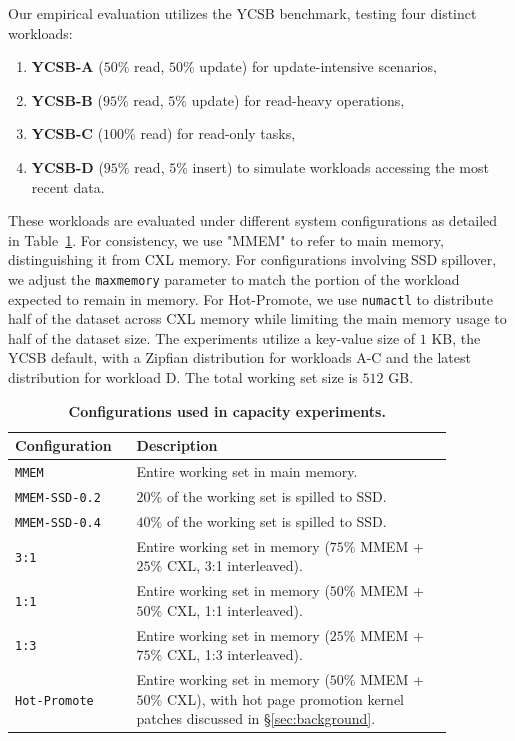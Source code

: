 Our empirical evaluation utilizes the YCSB benchmark, testing four distinct workloads:
\begin{enumerate}[leftmargin=*, itemsep=0pt]
    \item \textbf{YCSB-A} ($50\%$ read, $50\%$ update) for update-intensive scenarios,
    \item \textbf{YCSB-B} ($95\%$ read, $5\%$ update) for read-heavy operations,
    \item \textbf{YCSB-C} ($100\%$ read) for read-only tasks,
    \item \textbf{YCSB-D} ($95\%$ read, $5\%$ insert) to simulate workloads accessing the most recent data.
\end{enumerate}
These workloads are evaluated under different system configurations as detailed in Table~\ref{tab:swconfig}. For consistency, we use "MMEM" to refer to main memory, distinguishing it from CXL memory. For configurations involving SSD spillover, we adjust the \texttt{maxmemory} parameter to match the portion of the workload expected to remain in memory. For Hot-Promote, we use \texttt{numactl} to distribute half of the dataset across CXL memory while limiting the main memory usage to half of the dataset size. The experiments utilize a key-value size of $1$ KB, the YCSB default, with a Zipfian distribution for workloads A-C and the latest distribution for workload D. The total working set size is $512$ GB.


\begin{table}[!t]
  \centering
  \small
  \begin{tabular}{|p{0.22\linewidth} | p{0.65\linewidth}|} 
        \hline
        Configuration & Description \\\hline
        \texttt{MMEM} & Entire working set in main memory. \\\hline
        \texttt{MMEM-SSD-0.2} & $20\%$ of the working set is spilled to SSD. \\\hline
        \texttt{MMEM-SSD-0.4} & $40\%$ of the working set is spilled to SSD. \\\hline
        \texttt{3:1} & Entire working set in memory ($75\%$ MMEM + $25\%$ CXL, 3:1 interleaved). \\\hline
        \texttt{1:1} & Entire working set in memory ($50\%$ MMEM + $50\%$ CXL, 1:1 interleaved). \\\hline
        \texttt{1:3} & Entire working set in memory ($25\%$ MMEM + $75\%$ CXL, 1:3 interleaved). \\\hline
        \texttt{Hot-Promote} & Entire working set in memory ($50\%$ MMEM + $50\%$ CXL), with hot page promotion kernel patches discussed in \S\ref{sec:background}. \\\hline
  \end{tabular}
  \caption[Configurations used in capacity experiments]{\textbf{Configurations used in capacity experiments.} }
  \label{tab:swconfig}
\end{table}

